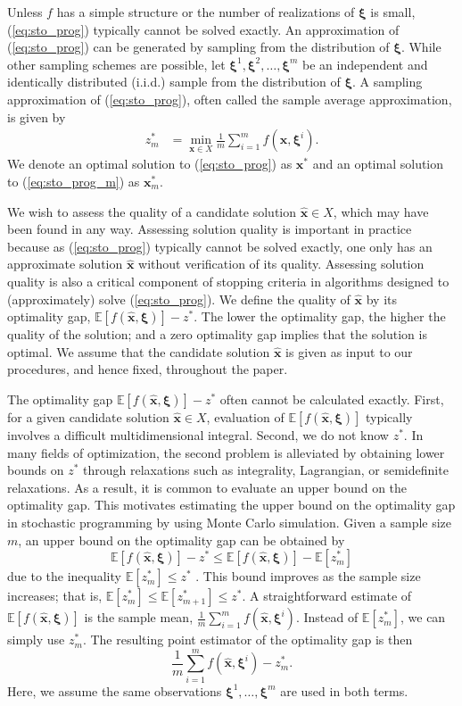 \documentclass[12pt]{article}
\newcommand{\e}[1]{\mathbb{E} \left[ #1 \right]
}
\newcommand{\x}{\mathbf{x}}
\newcommand{\xh}{{\hat{\x}}}
\newcommand{\xs}{\x^*}
\newcommand{\xit}{\boldsymbol{\xi}}
\newcommand{\xiti}{\xit^i}
\newcommand{\zs}{z^*}
\begin{document}
Unless $f$ has a simple structure or the number of realizations of $\xit$ is small, (\ref{eq:sto_prog}) typically cannot be solved exactly. 
An approximation of (\ref{eq:sto_prog}) can be generated by sampling from the distribution of $\xit$.
While other sampling schemes are possible, let $\xit^1, \xit^2, \dots, \xit^m$ be an independent and identically distributed (i.i.d.) sample from the distribution of $\xit$.
A sampling approximation of (\ref{eq:sto_prog}), often called the sample average approximation, is given by
\begin{align} \tag{SP$_m$} \label{eq:sto_prog_m}
	z_m^* & = \min_{\x \in X} \frac{1}{m} \sum_{i=1}^m f(\x,\xiti).
\end{align}
We denote an optimal solution to (\ref{eq:sto_prog}) as $\xs$ and an optimal solution to (\ref{eq:sto_prog_m}) as $\xs_m$.



We wish to assess the quality of a candidate solution $\xh \in X$, which may have been found in any way.
Assessing solution quality is important in practice because as (\ref{eq:sto_prog}) typically cannot be solved exactly, one only has an approximate solution $\xh$ without verification of its quality.
Assessing solution quality is also a critical component of stopping criteria in algorithms designed to (approximately) solve (\ref{eq:sto_prog}).
We define the quality of $\xh$ by its optimality gap, $\e{f(\xh,\xit)} - \zs$. 
The lower the optimality gap, the higher the quality of the solution; and a zero optimality gap implies that the solution is optimal. 
We assume that the candidate solution $\xh$ is given as input to our procedures, and hence fixed, throughout the paper. 


The optimality gap $\e{f(\xh,\xit)} - \zs$ often cannot be calculated exactly. First, for a given candidate solution $\xh \in X$, evaluation of $\e{f(\xh,\xit)}$ typically involves a difficult multidimensional integral. 
Second, we do not know $\zs$. 
In many fields of optimization, the second problem is alleviated by obtaining lower bounds on $\zs$ through relaxations such as integrality, Lagrangian, or semidefinite relaxations.
As a result, it is common to evaluate an upper bound on the optimality gap. 
This motivates estimating the upper bound on the optimality gap in stochastic programming by using Monte Carlo simulation.
Given a sample size $m$, an upper bound on the optimality gap can be obtained by $$
\e{f(\xh,\xit)} - \zs \leq \e{f(\xh,\xit)} - \e{\zs_m}
$$ 
due to the inequality $\e{\zs_m} \leq \zs$ \citep{Mak1999,norkin_pflug_ruszczynski_98}.
This bound improves as the sample size increases; that is, $\e{\zs_m} \leq \e{\zs_{m+1}} \leq \zs$.  
A straightforward estimate of $\e{f(\xh,\xit)}$ is the sample mean, $\frac{1}{m} \sum_{i=1}^m f(\xh,\xiti)$. 
Instead of $\e{\zs_m}$, we can simply use $\zs_m$.  
The resulting point estimator of the optimality gap is then 
$$
\frac{1}{m} \sum_{i=1}^m f(\xh,\xiti) - \zs_m.
$$ 
Here, we assume the same observations $\xit^1, \dots, \xit^m$ are used in both terms.  
\end{document}

